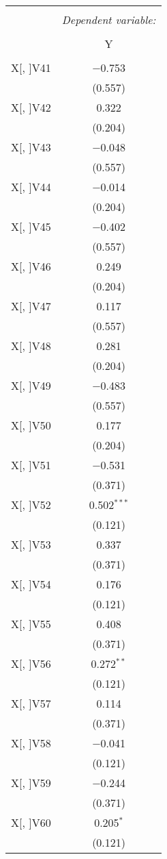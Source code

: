 \documentclass[11pt, a4paper]{article}
\begin{document}
\begin{multicols}{2}
\FloatBarrier
\begin{center}
\begin{tabular}{@{\extracolsep{5pt}}lc} 
\\[-1.8ex]\hline 
\hline \\[-1.8ex] 
 & \multicolumn{1}{c}{\textit{Dependent variable:}} \\ 
\cline{2-2} 
\\[-1.8ex] & Y \\ 
\hline \\[-1.8ex] 
 X[, ]V41 & $-$0.753 \\ 
  & (0.557) \\ 
 X[, ]V42 & 0.322 \\ 
  & (0.204) \\  
 X[, ]V43 & $-$0.048 \\ 
  & (0.557) \\  
 X[, ]V44 & $-$0.014 \\ 
  & (0.204) \\  
 X[, ]V45 & $-$0.402 \\ 
  & (0.557) \\  
 X[, ]V46 & 0.249 \\ 
  & (0.204) \\ 
 X[, ]V47 & 0.117 \\ 
  & (0.557) \\  
 X[, ]V48 & 0.281 \\ 
  & (0.204) \\  
 X[, ]V49 & $-$0.483 \\ 
  & (0.557) \\ 
 X[, ]V50 & 0.177 \\ 
  & (0.204) \\  
 X[, ]V51 & $-$0.531 \\ 
  & (0.371) \\  
 X[, ]V52 & 0.502$^{***}$ \\ 
  & (0.121) \\  
 X[, ]V53 & 0.337 \\ 
  & (0.371) \\ 
 X[, ]V54 & 0.176 \\ 
  & (0.121) \\ 
 X[, ]V55 & 0.408 \\ 
  & (0.371) \\  
 X[, ]V56 & 0.272$^{**}$ \\ 
  & (0.121) \\  
 X[, ]V57 & 0.114 \\ 
  & (0.371) \\  
 X[, ]V58 & $-$0.041 \\ 
  & (0.121) \\ 
 X[, ]V59 & $-$0.244 \\ 
  & (0.371) \\  
 X[, ]V60 & 0.205$^{*}$ \\ 
  & (0.121) \\  
\end{tabular} 
\end{center}
\FloatBarrier


\end{multicols}
\end{document}
